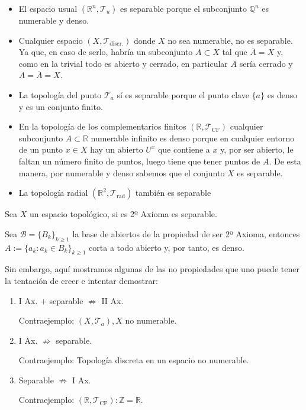 \begin{ej}
\begin{itemize}
    \item El espacio usual $\left( \mathbb{R}^n, \mathcal{T}_u \right)$ es separable porque el subconjunto $\mathbb{Q}^n$ es numerable y denso.
    \item Cualquier espacio $\left( X, \mathcal{T}_{\text{discr.}} \right)$ donde $X$ no sea numerable, no es separable. Ya que, en caso de serlo, habría un subconjunto $A\subset X$ tal que $\overline{A} = X$ y, como en la trivial todo es abierto y cerrado, en particular $A$ sería cerrado y $A = \overline{A} = X$.
    \item La topología del punto $\mathcal{T}_a$ sí es separable porque el punto clave $\{a\}$ es denso y es un conjunto finito.
    \item En la topología de los complementarios finitos $\left( \mathbb{R}, \mathcal{T}_{\text{CF}} \right)$ cualquier subconjunto $A\subset \mathbb{R}$ numerable infinito es denso porque en cualquier entorno de un punto $x\in X$ hay un abierto $U^x$ que contiene a $x$ y, por ser abierto, le faltan un número finito de puntos, luego tiene que tener puntos de $A$. De esta manera, por numerable y denso sabemos que el conjunto $X$ es separable.
    \item La topología radial $\left( \mathbb{R}^2, \mathcal{T}_{\text{rad}} \right)$ también es separable %
\end{itemize}
\end{ej}

\begin{prop}
Sea $X$ un espacio topológico, si es 2º Axioma es separable.
\end{prop}
\begin{demo}
Sea $\mathcal{B} = \{B_k\}_{k \ge 1}$ la base de abiertos de la propiedad de ser 2º Axioma, entonces $A := \{a_k : a_k \in B_k\}_{k \ge 1}$ corta a todo abierto y, por tanto, es denso.
\end{demo}

\begin{obs}
Sin embargo, aquí mostramos algunas de las no propiedades que uno puede tener la tentación de creer e intentar demostrar:
\begin{enumerate}
    \item I Ax. $+$ separable $\not \Rightarrow$ II Ax.
    
    			Contraejemplo: $\left( X, \mathcal{T}_a \right), X$ no numerable.
    \item I Ax. $\not \Rightarrow$ separable.
    
    			Contraejemplo: Topología discreta en un espacio no numerable.
    \item Separable $\not \Rightarrow$ I Ax.
    
    			Contraejemplo: $\left( \mathbb{R}, \mathcal{T}_{\text{CF}} \right) : \overline{\mathbb{Z}} = \mathbb{R}$.
\end{enumerate}
\end{obs}

